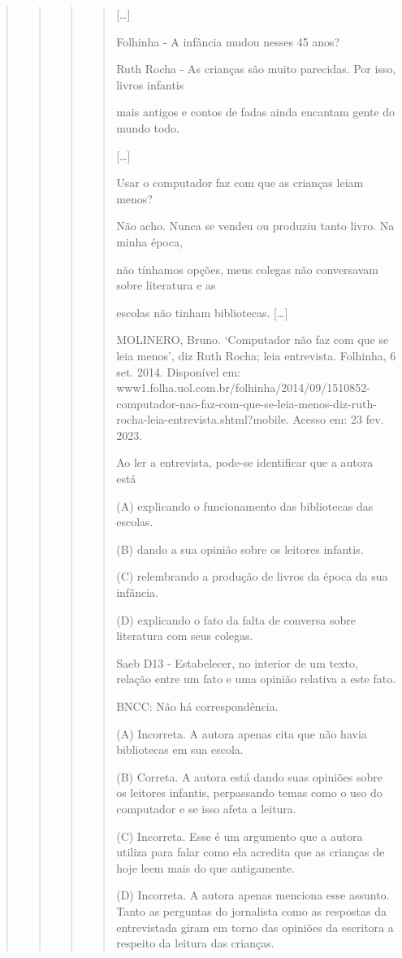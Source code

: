 \begin{quote}
\begin{quote}
\begin{quote}
\begin{quote}
{[}\ldots{}{]}

Folhinha - A infância mudou nesses 45 anos?

Ruth Rocha - As crianças são muito parecidas. Por isso, livros infantis

mais antigos e contos de fadas ainda encantam gente do mundo todo.

{[}\ldots{}{]}

Usar o computador faz com que as crianças leiam menos?

Não acho. Nunca se vendeu ou produziu tanto livro. Na minha época,

não tínhamos opções, meus colegas não conversavam sobre literatura e as

escolas não tinham bibliotecas. {[}\ldots{}{]}

MOLINERO, Bruno. `Computador não faz com que se leia menos', diz Ruth
Rocha; leia entrevista. Folhinha, 6 set. 2014. Disponível em:
www1.folha.uol.com.br/folhinha/2014/09/1510852-computador-nao-faz-com-que-se-leia-menos-diz-ruth-rocha-leia-entrevista.shtml?mobile.
Acesso em: 23 fev. 2023.

Ao ler a entrevista, pode-se identificar que a autora está

(A) explicando o funcionamento das bibliotecas das escolas.

(B) dando a sua opinião sobre os leitores infantis.

(C) relembrando a produção de livros da época da sua infância.

(D) explicando o fato da falta de conversa sobre literatura com seus
colegas.

Saeb D13 - Estabelecer, no interior de um texto, relação entre um fato e
uma opinião relativa a este fato.

BNCC: Não há correspondência.

(A) Incorreta. A autora apenas cita que não havia bibliotecas em sua
escola.

(B) Correta. A autora está dando suas opiniões sobre os leitores
infantis, perpassando temas como o uso do computador e se isso afeta a
leitura.

(C) Incorreta. Esse é um argumento que a autora utiliza para falar como
ela acredita que as crianças de hoje leem mais do que antigamente.

(D) Incorreta. A autora apenas menciona esse assunto. Tanto as perguntas
do jornalista como as respostas da entrevistada giram em torno das
opiniões da escritora a respeito da leitura das crianças.
\end{quote}


\end{quote}
\end{quote}
\end{quote}
